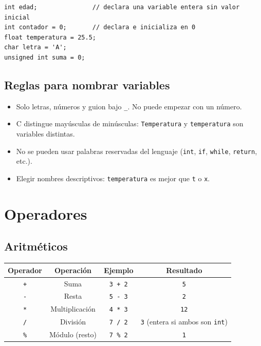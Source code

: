 \begin{lstlisting}[style=estilo-c]
int edad;               // declara una variable entera sin valor inicial
int contador = 0;       // declara e inicializa en 0
float temperatura = 25.5;
char letra = 'A';
unsigned int suma = 0;
\end{lstlisting}

\subsection{Reglas para nombrar variables}

\begin{itemize}
    \item Solo letras, números y guion bajo \texttt{\_}. No puede empezar con un número.
    \item C distingue mayúsculas de minúsculas: \texttt{Temperatura} y \texttt{temperatura} son variables distintas.
    \item No se pueden usar palabras reservadas del lenguaje (\texttt{int}, \texttt{if}, \texttt{while}, \texttt{return}, etc.).
    \item Elegir nombres descriptivos: \texttt{temperatura} es mejor que \texttt{t} o \texttt{x}.
\end{itemize}

\section{Operadores}

\subsection{Aritméticos}

\begin{table}[H]
\centering
\begin{tabular}{cccc}
\toprule
Operador & Operación & Ejemplo & Resultado \\
\midrule
\texttt{+} & Suma & \texttt{3 + 2} & \texttt{5} \\
\texttt{-} & Resta & \texttt{5 - 3} & \texttt{2} \\
\texttt{*} & Multiplicación & \texttt{4 * 3} & \texttt{12} \\
\texttt{/} & División & \texttt{7 / 2} & \texttt{3} (entera si ambos son \texttt{int}) \\
\texttt{\%} & Módulo (resto) & \texttt{7 \% 2} & \texttt{1} \\
\bottomrule
\end{tabular}
\end{table}

